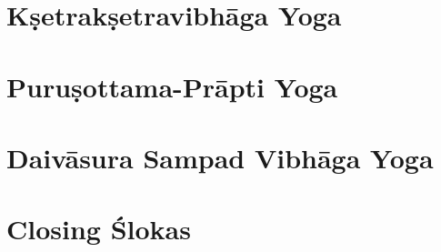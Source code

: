 \documentclass{scrbook}
\begin{document}
\chapter{Kṣetrakṣetravibhāga Yoga}
\begin{multicols}{2}
    
\end{multicols}

\setcounter{chapter}{14}

\chapter{Puruṣottama-Prāpti Yoga}
\begin{multicols}{2}
    
\end{multicols}

\chapter{Daivāsura Sampad Vibhāga Yoga}
\begin{multicols}{2}
    
\end{multicols}


\backmatter
\chapter{Closing Ślokas}

\end{document}
